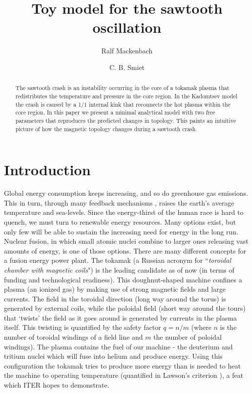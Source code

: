 \documentclass[%
superscriptaddress,
amsmath,amssymb,
aps,
pre,
floatfix,
]{revtex4-2}
\begin{document}
\title{Toy model for the sawtooth oscillation}
\author{Ralf Mackenbach}
\author{C. B. Smiet}

\begin{abstract}
  The sawtooth crash is an instability occurring in the core of a tokamak plasma that redistributes the temperature and pressure in the core region.
  In the Kadomtsev model the crash is caused by a 1/1 internal kink that reconnects the hot plasma within the core region.
  In this paper we present a minimal analytical model with two free parameters that reproduces the predicted changes in topology.
  This paints an intuitive picture of how the magnetic topology changes during a sawtooth crash.
\end{abstract}
\maketitle


\section{Introduction}
Global energy consumption keeps increasing, and so do greenhouse gas emissions. This in turn, through many feedback mechanisms \cite{Curry1995,Bloom2010}, raises the earth's average temperature and sea-levels. Since the energy-thirst of the human race is hard to quench, we must turn to renewable energy resources. Many options exist, but only few will be able to sustain the increasing need for energy in the long run. Nuclear fusion, in which small atomic nuclei combine to larger ones releasing vast amounts of energy, is one of those options. 
There are many different concepts for a fusion energy power plant. The tokamak (a Russian acronym for ``\textit{toroidal chamber with magnetic coils}") is the leading candidate as of now (in terms of funding and technological readiness). This doughnut-shaped machine confines a plasma (an ionized gas) by making use of strong magnetic fields and large currents. 
The field in the toroidal direction (long way around the torus) is generated by external coils, while the poloidal field (short way around the tours) that `twists' the field as it goes around is generated by currents in the plasma itself. 
This twisting is quantified by the safety factor $q=n/m$ (where $n$ is the number of toroidal windings of a field line and $m$ the number of poloidal windings).
The plasma contains the fuel of our machine - the deuterium and tritium nuclei which will fuse into helium and produce energy. Using this configuration the tokamak tries to produce more energy than is needed to heat the machine to operating temperature (quantified in Lawson's criterion \cite{Lawson1957}), a feat which ITER hopes to demonstrate.
\end{document}
